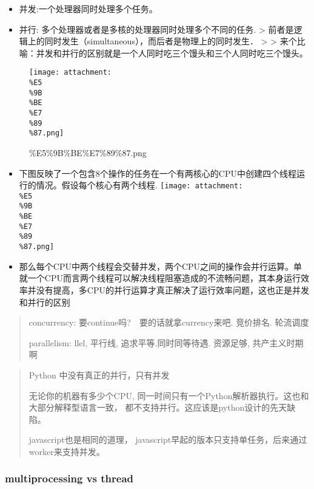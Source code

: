 \documentclass[11pt]{article}
\makeatletter
\def\maxwidth{\ifdim\Gin@nat@width>\linewidth\linewidth
    \else\Gin@nat@width\fi}
\let\Oldincludegraphics\includegraphics
\renewcommand{\includegraphics}[1]{\Oldincludegraphics[width=.8\maxwidth]{#1}}
\providecommand{\tightlist}{%
      \setlength{\itemsep}{0pt}\setlength{\parskip}{0pt}}
\makeatother
\begin{document}
\begin{itemize}
\tightlist
\item
  并发:一个处理器同时处理多个任务。
\item
  并行: 多个处理器或者是多核的处理器同时处理多个不同的任务.
  \textgreater{}
  前者是逻辑上的同时发生（simultaneous），而后者是物理上的同时发生．
  \textgreater{} \textgreater{}
  来个比喻：并发和并行的区别就是一个人同时吃三个馒头和三个人同时吃三个馒头。
\end{itemize}

    \begin{figure}
\centering
\texttt{[image: attachment:\\\%E5\\\%9B\\\%BE\\\%E7\\\%89\\\%87.png]}
\caption{\%E5\%9B\%BE\%E7\%89\%87.png}
\end{figure}

    \begin{itemize}
\tightlist
\item
  下图反映了一个包含8个操作的任务在一个有两核心的CPU中创建四个线程运行的情况。假设每个核心有两个线程.
  \texttt{[image: attachment:\\\%E5\\\%9B\\\%BE\\\%E7\\\%89\\\%87.png]}
\end{itemize}

    \begin{itemize}
\tightlist
\item
  那么每个CPU中两个线程会交替并发，两个CPU之间的操作会并行运算。单就一个CPU而言两个线程可以解决线程阻塞造成的不流畅问题，其本身运行效率并没有提高，多CPU的并行运算才真正解决了运行效率问题，这也正是并发和并行的区别
\end{itemize}

    \begin{quote}
concurrency: 要continue吗?　要的话就拿currency来吧. 竞价排名. 轮流调度

parallelism: llel, 平行线, 追求平等.同时同等待遇. 资源足够,
共产主义时期啊
\end{quote}

    \begin{quote}
Python 中没有真正的并行，只有并发

无论你的机器有多少个CPU,
同一时间只有一个Python解析器执行。这也和大部分解释型语言一致，
都不支持并行。这应该是python设计的先天缺陷。

javascript也是相同的道理，
javascript早起的版本只支持单任务，后来通过worker来支持并发。
\end{quote}

    \hypertarget{multiprocessing-vs-thread}{%
\subsubsection{multiprocessing vs
thread}\label{multiprocessing-vs-thread}}
\end{document}
